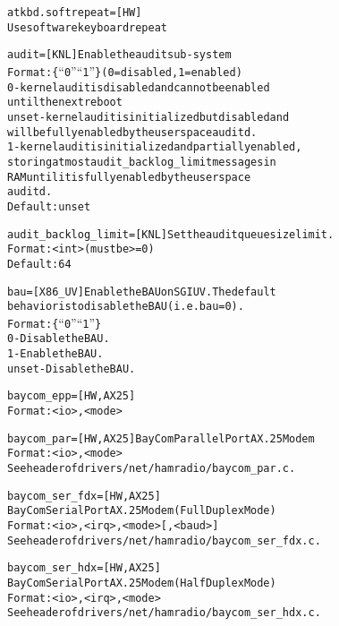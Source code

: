 \documentclass[a4paper,8pt,english]{sphinxmanual}
\begin{document}
\begin{alltt}
        atkbd.softrepeat= {[}HW{]}
                        Use software keyboard repeat

        audit=          {[}KNL{]} Enable the audit sub-system
                        Format: \{ ``0'' \textbar{} ``1'' \} (0 = disabled, 1 = enabled)
                        0 - kernel audit is disabled and can not be enabled
                            until the next reboot
                        unset - kernel audit is initialized but disabled and
                            will be fully enabled by the userspace auditd.
                        1 - kernel audit is initialized and partially enabled,
                            storing at most audit\_backlog\_limit messages in
                            RAM until it is fully enabled by the userspace
                            auditd.
                        Default: unset

        audit\_backlog\_limit= {[}KNL{]} Set the audit queue size limit.
                        Format: \textless{}int\textgreater{} (must be \textgreater{}=0)
                        Default: 64

        bau=            {[}X86\_UV{]} Enable the BAU on SGI UV.  The default
                        behavior is to disable the BAU (i.e. bau=0).
                        Format: \{ ``0'' \textbar{} ``1'' \}
                        0 - Disable the BAU.
                        1 - Enable the BAU.
                        unset - Disable the BAU.

        baycom\_epp=     {[}HW,AX25{]}
                        Format: \textless{}io\textgreater{},\textless{}mode\textgreater{}

        baycom\_par=     {[}HW,AX25{]} BayCom Parallel Port AX.25 Modem
                        Format: \textless{}io\textgreater{},\textless{}mode\textgreater{}
                        See header of drivers/net/hamradio/baycom\_par.c.

        baycom\_ser\_fdx= {[}HW,AX25{]}
                        BayCom Serial Port AX.25 Modem (Full Duplex Mode)
                        Format: \textless{}io\textgreater{},\textless{}irq\textgreater{},\textless{}mode\textgreater{}{[},\textless{}baud\textgreater{}{]}
                        See header of drivers/net/hamradio/baycom\_ser\_fdx.c.

        baycom\_ser\_hdx= {[}HW,AX25{]}
                        BayCom Serial Port AX.25 Modem (Half Duplex Mode)
                        Format: \textless{}io\textgreater{},\textless{}irq\textgreater{},\textless{}mode\textgreater{}
                        See header of drivers/net/hamradio/baycom\_ser\_hdx.c.


\end{alltt}
\end{document}
